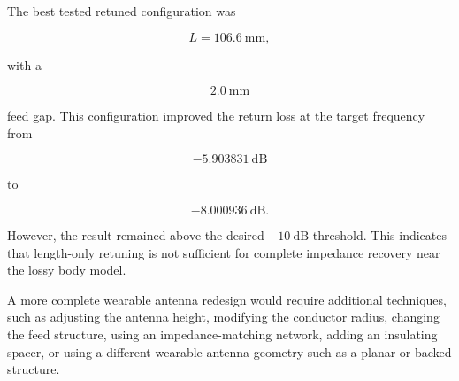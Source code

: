 \begin{table}[htbp]
\centering
\caption{Summary of retuning results for the \(5~\mathrm{mm}\) body-separation case.}
\label{tab:retuning-summary}
\end{table}

The best tested retuned configuration was

\[
L = 106.6~\mathrm{mm},
\]

with a

\[
2.0~\mathrm{mm}
\]

feed gap. This configuration improved the return loss at the target frequency from

\[
-5.903831~\mathrm{dB}
\]

to

\[
-8.000936~\mathrm{dB}.
\]

However, the result remained above the desired \(-10~\mathrm{dB}\) threshold. This indicates that length-only retuning is not sufficient for complete impedance recovery near the lossy body model.

A more complete wearable antenna redesign would require additional techniques, such as adjusting the antenna height, modifying the conductor radius, changing the feed structure, using an impedance-matching network, adding an insulating spacer, or using a different wearable antenna geometry such as a planar or backed structure.

